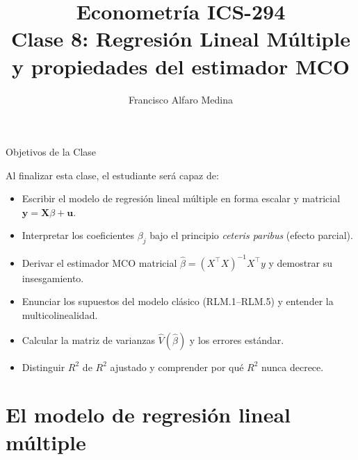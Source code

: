 \documentclass{beamer}
\title[ICS-294]{Econometría ICS-294\\ \small{Clase 8: Regresión Lineal Múltiple y propiedades del estimador MCO}}
\author{Francisco Alfaro Medina}
\institute[USM]
{Universidad Técnica Federico Santa María\\ %
	\medskip
	\textit{francisco.alfaro@usm.cl} %

}
\date{}
\begin{document}
\begin{frame}
	\titlepage %


\end{frame}
\logo{}

\begin{frame}{Objetivos de la Clase}

Al finalizar esta clase, el estudiante será capaz de:

\begin{itemize}
    \item[\checkmark] Escribir el modelo de regresión lineal múltiple en forma escalar y matricial $\mathbf{y} = \mathbf{X}\beta + \mathbf{u}$.
    \item[\checkmark] Interpretar los coeficientes $\beta_j$ bajo el principio \emph{ceteris paribus} (efecto parcial).
    \item[\checkmark] Derivar el estimador MCO matricial $\hat{\beta} = (X^{\top}X)^{-1}X^{\top}y$ y demostrar su insesgamiento.
    \item[\checkmark] Enunciar los supuestos del modelo clásico (RLM.1--RLM.5) y entender la multicolinealidad.
    \item[\checkmark] Calcular la matriz de varianzas $\hat{V}(\hat{\beta})$ y los errores estándar.
    \item[\checkmark] Distinguir $R^2$ de $R^2$ ajustado y comprender por qué $R^2$ nunca decrece.
\end{itemize}

\end{frame}

\section{El modelo de regresión lineal múltiple}
\end{document}
